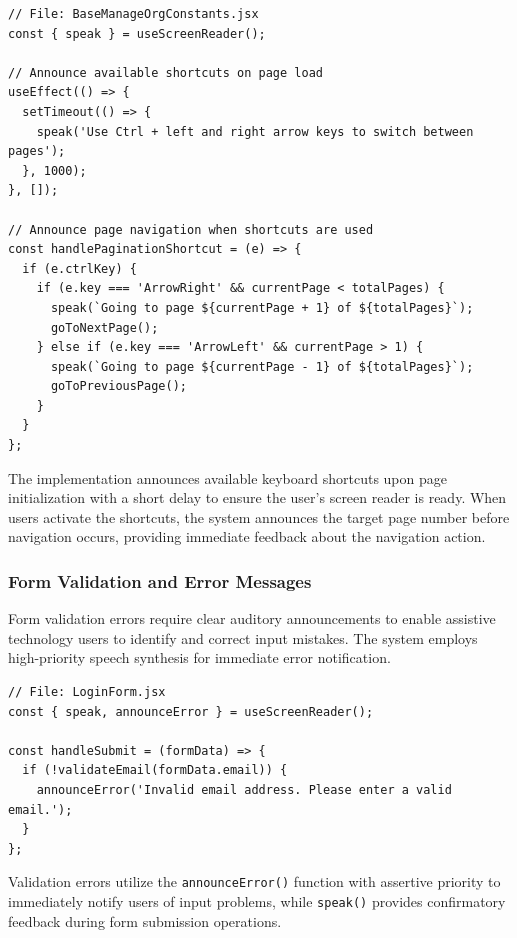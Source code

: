 \begin{lstlisting}[caption={Keyboard shortcut announcements}, label={lst:shortcuts-sr}]
// File: BaseManageOrgConstants.jsx
const { speak } = useScreenReader();

// Announce available shortcuts on page load
useEffect(() => {
  setTimeout(() => {
    speak('Use Ctrl + left and right arrow keys to switch between pages');
  }, 1000);
}, []);

// Announce page navigation when shortcuts are used
const handlePaginationShortcut = (e) => {
  if (e.ctrlKey) {
    if (e.key === 'ArrowRight' && currentPage < totalPages) {
      speak(`Going to page ${currentPage + 1} of ${totalPages}`);
      goToNextPage();
    } else if (e.key === 'ArrowLeft' && currentPage > 1) {
      speak(`Going to page ${currentPage - 1} of ${totalPages}`);
      goToPreviousPage();
    }
  }
};
\end{lstlisting}

The implementation announces available keyboard shortcuts upon page initialization with a short delay to ensure the user's screen reader is ready. When users activate the shortcuts, the system announces the target page number before navigation occurs, providing immediate feedback about the navigation action.

\subsubsection{Form Validation and Error Messages}

Form validation errors require clear auditory announcements to enable assistive technology users to identify and correct input mistakes. The system employs high-priority speech synthesis for immediate error notification.

\begin{lstlisting}[caption={Form validation error announcements}, label={lst:validation-sr}]
// File: LoginForm.jsx
const { speak, announceError } = useScreenReader();

const handleSubmit = (formData) => {
  if (!validateEmail(formData.email)) {
    announceError('Invalid email address. Please enter a valid email.');
  }
};
\end{lstlisting}

Validation errors utilize the \texttt{announceError()} function with assertive priority to immediately notify users of input problems, while \texttt{speak()} provides confirmatory feedback during form submission operations.

